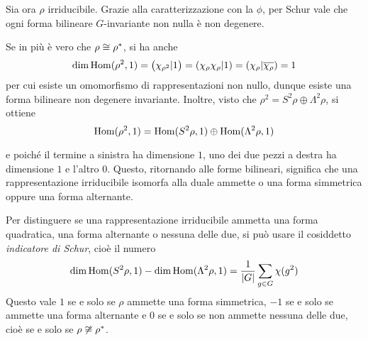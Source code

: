 	
	Sia ora $\rho$ irriducibile. Grazie alla caratterizzazione con la $\phi$, per Schur vale che ogni forma bilineare $G$-invariante non nulla è non degenere.
	
	Se in più è vero che $\rho\cong\rho^*$, si ha anche 
	\[
		\dim\operatorname{Hom}(\rho^2,1)=\left(\chi_{\rho^2} | 1\right) = \left(\chi_\rho\chi_\rho | 1\right) = \left(\chi_\rho | \overline{\chi_\rho}\right) = 1
	\]
	per cui esiste un omomorfismo di rappresentazioni non nullo, dunque esiste una forma bilineare non degenere invariante. Inoltre, visto che $\rho^2 = S^2\rho \oplus \Lambda^2\rho$, si ottiene
	\[
		\operatorname{Hom}(\rho^2,1)=\operatorname{Hom}(S^2\rho,1) \oplus \operatorname{Hom}(\Lambda^2\rho,1)
	\]
	
	e poiché il termine a sinistra ha dimensione $1$, uno dei due pezzi a destra ha dimensione $1$ e l'altro $0$. Questo, ritornando alle forme bilineari, significa che una rappresentazione irriducibile isomorfa alla duale ammette o una forma simmetrica oppure una forma alternante.
	
	\begin{myobs}
		Per distinguere se una rappresentazione irriducibile ammetta una forma quadratica, una forma alternante o nessuna delle due, si può usare il cosiddetto \emph{indicatore di Schur}, cioè il numero
		\[
			\dim\operatorname{Hom}(S^2\rho,1)-\dim\operatorname{Hom}(\Lambda^2\rho,1) = \frac{1}{\left|G\right|}\sum_{g\in G}\chi(g^2)
		\]
		Questo vale $1$ se e solo se $\rho$ ammette una forma simmetrica, $-1$ se e solo se ammette una forma alternante e $0$ se e solo se non ammette nessuna delle due, cioè se e solo se $\rho\not\cong\rho^*$.

	\end{myobs}
	
	
	
	